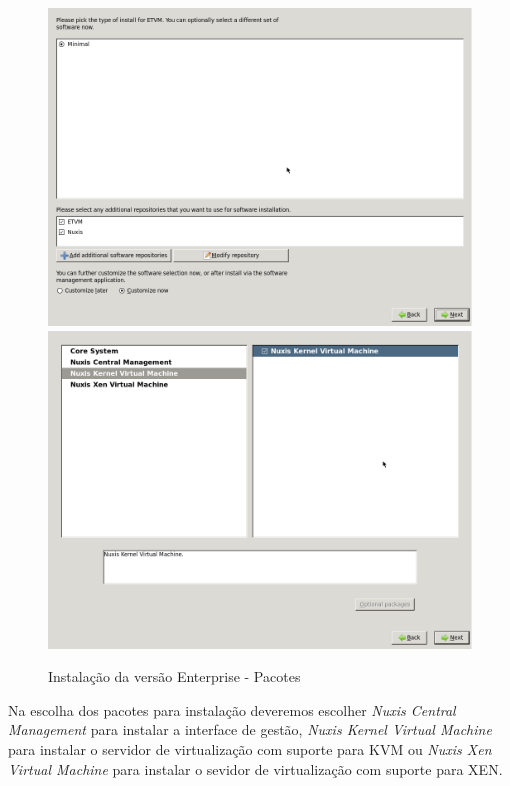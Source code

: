 \begin{figure}[H]
	\begin{center}
	\includegraphics[scale=0.2]{screenshots/install/nuxis/packages_selection_01.png}
	\includegraphics[scale=0.2]{screenshots/install/nuxis/packages_selection_02.png}
    \caption{Instalação da versão Enterprise - Pacotes}
	\label{fig:installation_enterprise_05}
	\end{center}
\end{figure}
Na escolha dos pacotes para instalação deveremos escolher \emph{Nuxis Central Management} para instalar a interface de gestão, \emph{Nuxis Kernel Virtual Machine} para instalar o servidor de virtualização com suporte para KVM ou \emph{Nuxis Xen Virtual Machine} para instalar o sevidor de virtualização com suporte para XEN.

